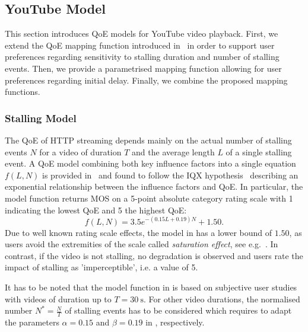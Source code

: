 \subsection{YouTube  Model}\label{sec:application:qoe_user_behaviour:typical_user_scenarios:youtube_qoe}
This section introduces \gls{QoE} models for YouTube video playback.
First, we extend the \gls{QoE} mapping function introduced in~\cite{Hossfeld2013c} in order to support user preferences regarding sensitivity to stalling duration and number of stalling events.
Then, we provide a parametrised mapping function allowing for user preferences regarding initial delay.
Finally, we combine the proposed mapping functions.

\subsubsection*{Stalling  Model}\label{sec:application:qoe_user_behaviour:typical_user_scenarios:youtube_qoe:stalling}
The \gls{QoE} of \gls{HTTP} streaming depends mainly on the actual number of stalling events \(N\) for a video of duration \(T\) and the average length \(L\) of a single stalling event.
A \gls{QoE} model combining both key influence factors into a single equation \(f(L,N)\) is provided in~\cite{Hossfeld2013c} and found to follow the IQX hypothesis~\cite{Fiedler2010} describing an exponential relationship between the influence factors and \gls{QoE}.
In particular, the model function returns \gls{MOS} on a 5-point absolute category rating scale with 1 indicating the lowest \gls{QoE} and 5 the highest \gls{QoE}:
\begin{equation}
 f(L,N) = 3.5 e^{-(0.15L + 0.19)N}+1.50.
\label{eq:application:qoe_user_behaviour:typical_user_scenarios:youtube_qoe:stalling:original_model}
\end{equation}
Due to well known rating scale effects, the model in  has a lower bound of \(1.50\), as users avoid the extremities of the scale called \emph{saturation effect}, see e.g.~\cite{Moller2000}.
In contrast, if the video is not stalling, no degradation is observed and users rate the impact of stalling as 'imperceptible', i.e. a value of 5.

It has to be noted that the model function in  is based on subjective user studies with videos of duration up to \(T=\SI{30}{\second}\).
For other video durations, the normalised number \(N^*=\frac{N}{T}\) of stalling events has to be considered which requires to adapt the parameters \(\alpha=0.15\) and \(\beta=0.19\) in , respectively.

